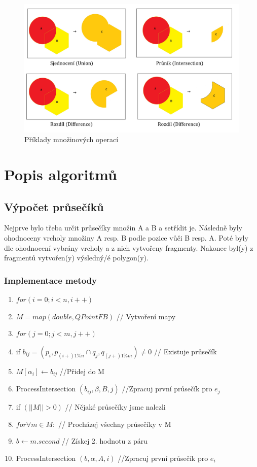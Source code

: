 \documentclass[a4paper, 12pt]{article}
\begin{document}
\begin{figure}[h]
	\centering
	\includegraphics[width=18cm]{BO.jpg}
	\caption{Příklady množinových operací}
\end{figure}


\clearpage
\section{Popis algoritmů}

\subsection{Výpočet průsečíků}
Nejprve bylo třeba určit průsečíky množin A a B a setřídit je. Následně byly ohodnoceny vrcholy množiny A resp. B podle pozice vůči B resp. A. Poté byly dle ohodnocení vybrány vrcholy a z nich vytvořeny fragmenty. Nakonec byl(y) z fragmentů vytvořen(y) výsledný/é polygon(y).

\subsubsection{Implementace metody}
\begin{enumerate}
\item $ for (i = 0; i < n, i++) $ 
\item \hspace {1cm} $ M = map (double, QPointFB) $ // Vytvoření mapy 
\item \hspace {1cm} $ for (j = 0; j < m, j++) $
\item \hspace {2cm} if $ b_{ij} = (p_i, p_{(i+)1\%n} \cap q_j, q_{(j+)1\%m }) \neq 0$ // Existuje průsečík
\item \hspace {3cm} $ M [\alpha_i] \longleftarrow b_{ij}$ //Přidej do M
\item \hspace {3cm} ProcessIntersection $ (b_{ij}, \beta, B, j) $ //Zpracuj první průsečík pro $ e_j $
\item \hspace {1cm} if $(||M|| > 0)$ // Nějaké průsečíky jsme nalezli
\item \hspace{2cm} $  for \forall m \in M: $ // Procházej všechny průsečíky v M
\item  \hspace{3cm} $ b \longleftarrow m.second $ // Získej 2. hodnotu z páru
\item \hspace{3cm} ProcessIntersection $ (b, \alpha, A, i) $ //Zpracuj první průsečík pro $ e_i $
\end{enumerate}
\end{document}
